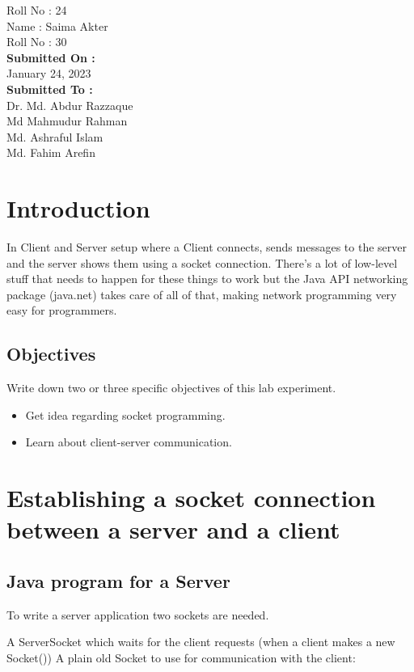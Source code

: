 \documentclass[11pt]{article}
\begin{document}
\begin{titlepage}
\begin{large}
			Roll No : 24\\[12pt]
			Name : Saima Akter\\[8pt]
			Roll No : 30\\[12pt]
		\textbf{Submitted On : \\[12pt]}
			January 24, 2023\\[20pt]
		\textbf{Submitted To :\\[12pt]}
			Dr. Md. Abdur Razzaque\\[12pt]
                Md Mahmudur Rahman\\[12pt]
                Md. Ashraful Islam\\[12pt]
                Md. Fahim Arefin
	\end{large}
\end{titlepage}

\section{Introduction}
In Client and Server setup where a Client connects, sends messages to the server and the server shows them using a socket connection. There’s a lot of low-level stuff that needs to happen for these things to work but the Java API networking package (java.net) takes care of all of that, making network programming very easy for programmers.

\subsection{Objectives}
Write down two or three specific objectives of this lab experiment.
\begin{itemize}
    \item Get idea regarding socket programming.
    \item Learn about client-server communication.
\end{itemize}

\section{Establishing a socket connection between a server and a client}
\subsection{Java program for a Server }
To write a server application two sockets are needed. 

    A ServerSocket which waits for the client requests (when a client makes a new Socket())
    A plain old Socket to use for communication with the client: \\[12pt]
\end{document}
